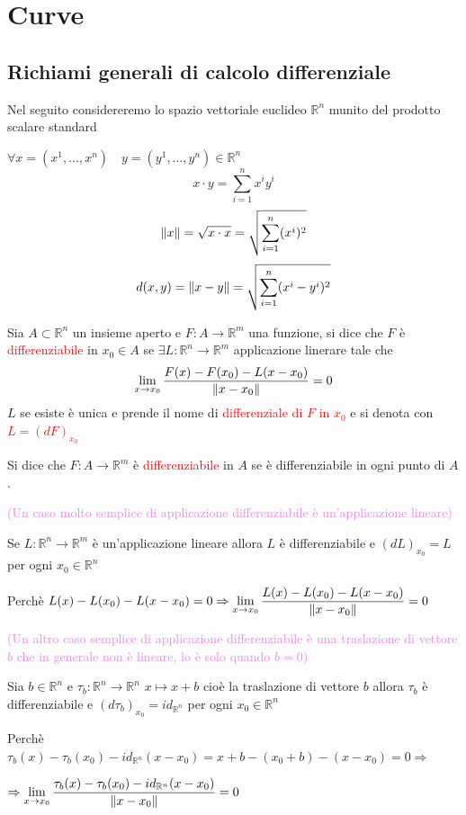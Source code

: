 \chapter{Curve}
    \section{Richiami generali di calcolo differenziale}
        Nel seguito considereremo lo spazio vettoriale euclideo $\mathbb{R}^n$ munito del prodotto scalare standard

        $\forall x=(x^1,\ldots,x^n) \quad y=(y^1,\ldots,y^n) \in \mathbb{R}^n$ 
        \[ x \cdot y = \sum_{i=1}^n x^i y^i \]
        \[ \lVert x\rVert = \sqrt{x \cdot x} = \sqrt{\sum_{i=1}^n (x^i)^2} \]
        \[d(x,y) = \lVert x-y\rVert= \sqrt{\sum_{i=1}^n (x^i - y^i)^2} \]
        \begin{definizione}
        Sia $A \subset \mathbb{R}^n$ un insieme aperto e $F: A \to \mathbb{R}^m$ una funzione, si dice che $F$ è
        \textcolor{red}{differenziabile} in $x_0 \in A$ se $\exists L: \mathbb{R}^n \to \mathbb{R}^m$ applicazione linerare tale che
        \[ \lim_{x \to x_0} \frac{F(x) - F(x_0) - L(x-x_0)}{\lVert x-x_0\rVert} = 0 \]
        $L$ se esiste è unica e prende il nome di \textcolor{red}{differenziale di $F$ in $x_0$} e si denota con \textcolor{red}{$L=\left(dF\right)_{x_0}$}

        Si dice che $F: A \to \mathbb{R}^m$ è \textcolor{red}{differenziabile} in $A$ se è differenziabile in ogni punto di $A$.
        \end{definizione}
        \begin{esempio} \textcolor{violet}{(Un caso molto semplice di applicazione differenziabile è un'applicazione lineare)}
        
        Se $L: \mathbb{R}^n \to \mathbb{R}^m$ è un'applicazione lineare allora $L$ è differenziabile e $\left(dL\right)_{x_0}=L$ per ogni $x_0 \in \mathbb{R}^n$
  
        Perchè $\displaystyle L(x)-L(x_0)-L(x-x_0)=0 \Rightarrow \lim_{x \to x_0} \frac{L(x)-L(x_0)-L(x-x_0)}{\lVert x-x_0\rVert} = 0$
        \end{esempio}
        \begin{esempio} 
        \textcolor{violet}{(Un altro caso semplice di applicazione differenziabile è una traslazione di vettore $b$ che in generale non è lineare, lo è solo quando $b=0$)}
        
        Sia $b \in \mathbb{R}^n$ e $\tau_b: \mathbb{R}^n \to \mathbb{R}^n$ $x \mapsto x+b$ cioè la traslazione di vettore $b$ allora 
        $\tau_b$ è differenziabile e $\left(d\tau_b\right)_{x_0} = id_{\mathbb{R}^n}$ per ogni $x_0 \in \mathbb{R}^n$

        Perchè $\displaystyle \tau_b(x)-\tau_b(x_0)-id_{\mathbb{R}^n}(x-x_0) =x+b-(x_0+b)-(x-x_0)=0 \Rightarrow$
        
        $\displaystyle \Rightarrow \lim_{x \to x_0} \frac{\tau_b(x)-\tau_b(x_0)-id_{\mathbb{R}^n}(x-x_0)}{\lVert x-x_0\rVert} = 0$
        \end{esempio}
